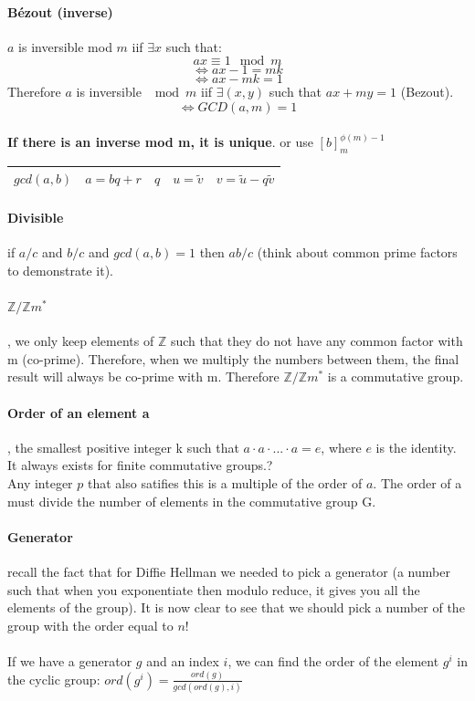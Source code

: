 \documentclass{article}
\begin{document}
\paragraph{Bézout (inverse)} $ a $ is inversible mod $ m $ iif $ \exists x $ such that:
\[ ax \equiv 1 \mod m \]
\[ \Leftrightarrow ax - 1 = mk \]
\[ \Leftrightarrow ax - mk = 1 \]
Therefore $ a $ is inversible $ \mod m $ iif $ \exists (x, y) $ such that $ ax + my = 1 $ (Bezout).\\
\[ \Leftrightarrow GCD(a, m) = 1 \]\\
\textbf{If there is an inverse mod m, it is unique}.
or use $ [b]_m^{\phi(m) -1} $

\begin{table}[h]
    \centering
    \begin{tabular}{|c|c|c|c|c|}
        \hline
        $ gcd(a,b) $ & $a = bq + r$ & $q$ & $u = \tilde{v}$ & $v = \tilde{u} - q\tilde{v} $ \\
        \hline
    \end{tabular}
    \label{tab:my_label}
\end{table}

\paragraph{Divisible} if $a/c$ and $b/c$ and $gcd(a, b) = 1$ then $ab/c$ (think about common prime factors to demonstrate it).

\paragraph{$\mathbb{Z}/\mathbb{Z}m^*$}, we only keep elements of $ \mathbb{Z} $ such that they do not have any common factor with m (co-prime). Therefore, when we multiply the numbers between them, the final result will always be co-prime with m. Therefore $\mathbb{Z}/\mathbb{Z}m^*$ is a commutative group.

\paragraph{Order of an element a}, the smallest positive integer k such that $ a \cdot a \cdot ... \cdot a  = e $, where $ e $ is the identity. It always exists for finite commutative groups.?\\
Any integer $p$ that also satifies this is a multiple of the order of $a$. The order of a must divide the number of elements in the commutative group G.

\paragraph{Generator} recall the fact that for Diffie Hellman we needed to pick a generator (a number such that when you exponentiate then modulo reduce, it gives you all the elements of the group). It is now clear to see that we should pick a number of the group with the order equal to $n$!\\\\
If we have a generator $g$ and an index $i$, we can find the order of the element $g^i$ in the cyclic group: $ord(g^i) = \frac{ord(g)}{gcd(ord(g), i)}$
\end{document}
